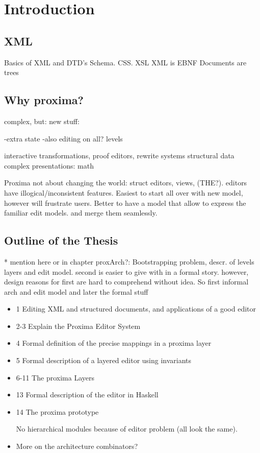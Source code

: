 \chapter{Introduction}
\label{chap:introduction}

\section{XML}
Basics of XML and DTD's  Schema. CSS. XSL
XML is EBNF 
Documents are trees


\section{Why proxima?}

complex, but:
new stuff:

-extra state
-also editing on all? levels


interactive transformations, proof editors, rewrite systems
structural data complex presentations: math

Proxima not about changing the world: struct editors, views, (THE?). editors have illogical/inconsistent features. Easiest to start all over with new model, however will frustrate users. Better to have a model that allow to express the familiar edit models. and merge them seamlessly.

\section{Outline of the Thesis}
* mention here or in chapter proxArch?:
Bootstrapping problem, descr. of levels layers and edit model. second is easier to give with in a formal story. however, design reasons for first are hard to comprehend without idea. So first informal arch and edit model and later the formal stuff

\begin{itemize}
\item 1 Editing XML and structured documents, and applications of a good editor
\item 2-3 Explain the Proxima Editor System
\item 4 Formal definition of the precise mappings in a proxima layer
\item 5 Formal description of a layered editor using invariants
\item 6-11 The proxima Layers 



\item 13 Formal description of the editor in Haskell
\item 14 The proxima prototype

No hierarchical modules because of editor problem (all look the same).

\item More on the architecture combinators?

\end{itemize}